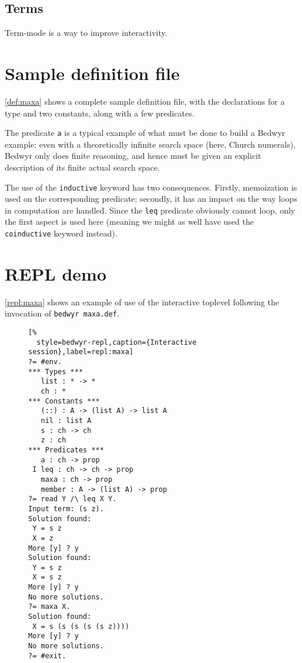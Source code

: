 \documentclass[a4paper,twocolumn]{article}
\begin{document}
\subsection{Terms}
\label{sec:terms}

Term-mode is a way to improve interactivity.

\section{Sample definition file}

\autoref{def:maxa} shows a complete sample definition file,
with the declarations for a type and two constants, along with a few predicates.

\begin{figure}[t]
  
\end{figure}

The predicate \lstinline+a+ is a typical example of what must be done to build
a Bedwyr example: even with a theoretically infinite search space
(here, Church numerals), Bedwyr only does finite reasoning, and hence must be
given an explicit description of its finite actual search space.

The use of the \lstinline+inductive+ keyword has two consequences.
Firstly, memoization is used on the corresponding predicate;
secondly, it has an impact on the way loops in computation are handled.
Since the \lstinline+leq+ predicate obviously cannot loop,
only the first aspect is used here (meaning we might as well have used the
\lstinline+coinductive+ keyword instead).

\section{REPL demo}

\autoref{repl:maxa} shows an example of use of the interactive toplevel
following the invocation of \verb+bedwyr maxa.def+.

\begin{figure}[t]\begin{lstlisting}[%
  style=bedwyr-repl,caption={Interactive session},label=repl:maxa]
?= #env.
*** Types ***
   list : * -> *
   ch : *
*** Constants ***
   (::) : A -> (list A) -> list A
   nil : list A
   s : ch -> ch
   z : ch
*** Predicates ***
   a : ch -> prop
 I leq : ch -> ch -> prop
   maxa : ch -> prop
   member : A -> (list A) -> prop
?= read Y /\ leq X Y.
Input term: (s z).
Solution found:
 Y = s z
 X = z
More [y] ? y
Solution found:
 Y = s z
 X = s z
More [y] ? y
No more solutions.
?= maxa X.
Solution found:
 X = s (s (s (s (s z))))
More [y] ? y
No more solutions.
?= #exit.
\end{lstlisting}\end{figure}
\end{document}
